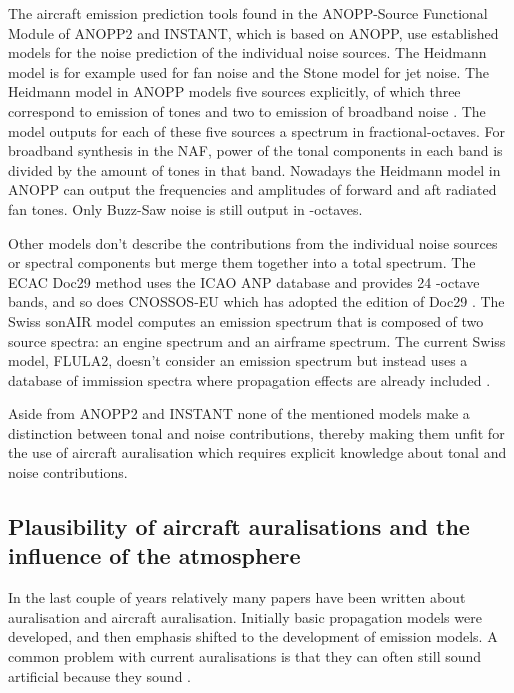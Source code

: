 The aircraft emission prediction tools found in the ANOPP-Source Functional
Module of ANOPP2 \cite{Lopes2016, Tuttle2017} and INSTANT\cite{Sahai2016b}, which is based
on ANOPP, use established models for the noise prediction of the individual
noise sources. The Heidmann model is for example used for fan noise and the
Stone model for jet noise. The Heidmann model in ANOPP models
five sources explicitly, of which three correspond to emission of tones and two
to emission of broadband noise \cite{Arntzen2014a}. The model outputs for each
of these five sources a spectrum in fractional-octaves.
For broadband synthesis in the NAF\cite{Aumann2015}, power of the tonal
components in each band is divided by the amount of tones in that band.
Nowadays the Heidmann model in ANOPP can output the frequencies and amplitudes
of forward and aft radiated fan tones. Only Buzz-Saw noise is still output in
-octaves.


Other models don't describe the contributions from the individual noise
sources or spectral components but merge them together into a total spectrum.
The ECAC Doc29 method \cite{Doc29_fourth_2016} uses the ICAO ANP database and
provides 24 -octave bands, and so does CNOSSOS-EU which has
adopted the  edition of Doc29 \cite{Doc29_third_2005}. The Swiss sonAIR
model \cite{Zellmann2016} computes an emission spectrum that is composed of two
source spectra: an engine spectrum and an airframe spectrum. The current Swiss
model, FLULA2, doesn't consider an emission spectrum but instead uses a database
of immission spectra where propagation effects are already included
\cite{EMPA2010,Schaffer2014}.

Aside from ANOPP2 and INSTANT none of the mentioned models make a distinction
between tonal and noise contributions, thereby making them unfit for the use of
aircraft auralisation which requires explicit knowledge about tonal and noise
contributions.

\subsection{Plausibility of aircraft auralisations and the influence of the atmosphere}
In the last couple of years relatively many papers have been written about
auralisation and aircraft auralisation. Initially basic propagation models were
developed, and then emphasis shifted to the development of emission models. A
common problem with current auralisations is that they can often still sound
artificial because they sound .


